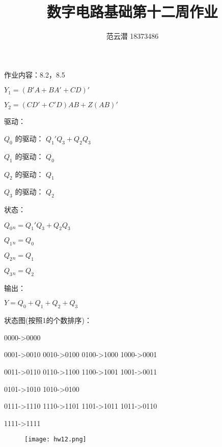 \documentclass[lang=cn,11pt,a4paper,cite=authoryear,twocolumn]{elegantpaper}
\title{数字电路基础\quad 第十二周作业}
\author{范云潜 18373486}
\institute{微电子学院 184111 班}
\date{\zhtoday}
\begin{document}
\maketitle

作业内容：8.2，8.5


\(Y_1 = (B' A + B A' + C D ) ' \) 

\(Y_2 = (C D' + C' D) A B + Z (AB)' \) 


驱动：

\(Q_0\) 的驱动： \(Q_1' Q_3 + Q_2 Q_3\) 

\(Q_1\) 的驱动： \(Q_0\) 

\(Q_2\) 的驱动： \(Q_1\) 

\(Q_3\) 的驱动： \(Q_2\) 

状态：

\(Q_0 {} _{n}  = Q_1' Q_3 + Q_2 Q_3\) 

\(Q_1 {} _{n}  = Q_0\) 

\(Q_2 {} _{n}  = Q_1\) 

\(Q_3 {} _{n}  = Q_2\) 

输出：

\(Y = Q_0 + Q_1 + Q_2 + Q_3\) 

状态图(按照1的个数排序)：

0000->0000

0001->0010
0010->0100
0100->1000
1000->0001

0011->0110
0110->1100
1100->1001
1001->0011

0101->1010
1010->0100

0111->1110
1110->1101
1101->1011
1011->0110

1111->1111

\begin{figure}[!htb]
    \centering
    \texttt{[image: hw12.png]}
\end{figure}

\end{document}
